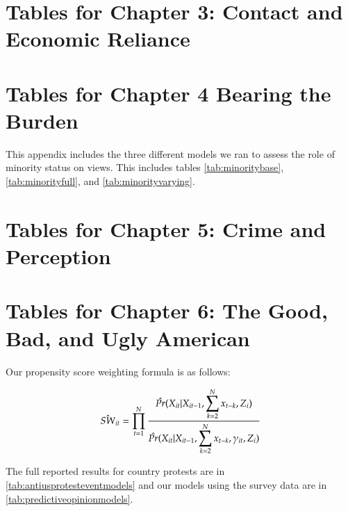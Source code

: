 


\appendix



\chapter{Tables for Chapter 3: Contact and Economic Reliance}


\chapter{Tables for Chapter 4 Bearing the Burden}

This appendix includes the three different models we ran to assess the role of minority status on views. This includes tables \ref{tab:minoritybase}, \ref{tab:minorityfull}, and \ref{tab:minorityvarying}. %




\vspace*{-4cm}


\vspace*{-4cm}

\chapter{Tables for Chapter 5: Crime and Perception}

\chapter{Tables for Chapter 6: The Good, Bad, and Ugly American}

Our propensity score weighting formula is as follows: 

\begin{equation}
	\hat{SW}_{it} = \prod_{t=1}^{N} {{\hat{Pr}(X_{it} | X_{it-1}, \displaystyle \sum_{k = 2}^{N} x_{t-k}  , Z_{i})}\over{\hat{Pr}(X_{it} | X_{it-1} ,  \displaystyle \sum_{k = 2}^{N} x_{t-k}, \gamma_{it} ,Z_{i})}} 
	\label{eq:structuralweights}
\end{equation}

The full reported results for country protests are in \ref{tab:antiusprotesteventmodels} and our models using the survey data are in \ref{tab:predictiveopinionmodels}. %




